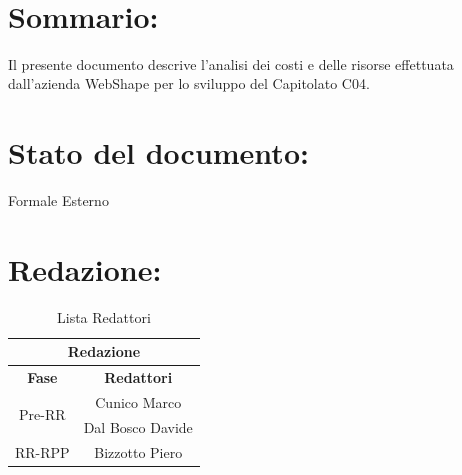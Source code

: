 \newpage

\begin{center} %
	\begin{Huge}	
				\textbf{\TITOLODOC}
			\\
	\end{Huge}
\end{center}

\section*{\LARGE Sommario:}
Il presente documento descrive l'analisi dei costi e delle risorse effettuata dall'azienda WebShape per lo sviluppo del Capitolato C04.

\indent \indent

\section*{\LARGE Stato del documento:}
\indent \indent
	Formale Esterno

\section*{\LARGE Redazione:}
	\begin{table}[!h]
		\begin{center}
			\begin{tabular}
				{|c|c|}
				\hline
				\multicolumn{2}{|c|}{ \textbf{Redazione} } \\
				\hline
				\textbf{Fase} & \textbf{Redattori} \\
				\hline
				\multirow{2}{*}{Pre-RR} & Cunico Marco\\
										& Dal Bosco Davide\\
				\hline
				\multirow{1}{*}{RR-RPP} & Bizzotto Piero\\
										
				\hline
			\end{tabular}
			\caption{Lista Redattori} %
			\label{tabredazione}
		\end{center}
	\end{table}
	
